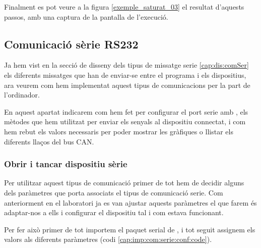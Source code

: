 Finalment es pot veure a la figura \ref{exemple_saturat_03} el resultat d'aquests passos, amb una captura de la pantalla de l'execució.
\begin{landscape}
\end{landscape}

\FloatBarrier

\subsection{Comunicació sèrie RS232}\label{cap:imp:com:serie}

Ja hem vist en la secció de disseny dels tipus de missatge serie \ref{cap:dis:comSer} els diferents missatges que han de enviar-se entre el programa \DCSMonitor i els dispositius, ara veurem com hem implementat aquest tipus de comunicacions per la part de l'ordinador.

En aquest apartat indicarem com hem fet per configurar el port serie amb \PySerial, els mètodes que hem utilitzat per enviar els senyals al dispositiu connectat, i com hem rebut els valors necessaris per poder mostrar les gràfiques o llistar els diferents llaços del bus CAN.

\subsubsection{Obrir i tancar dispositiu sèrie}\label{cap:imp:com:serie:openclose}

Per utilitzar aquest tipus de comunicació primer de tot hem de decidir alguns dels paràmetres que porta associats el tipus de comunicació serie. Com anteriorment en el laboratori ja es van ajustar aquests paràmetres el que farem és adaptar-nos a ells i configurar el dispositiu tal i com estava funcionant.

Per fer això primer de tot importem el paquet serial de \Python, i tot seguit assignem els valors als diferents paràmetres (codi \ref{cap:imp:com:serie:conf:code}).

